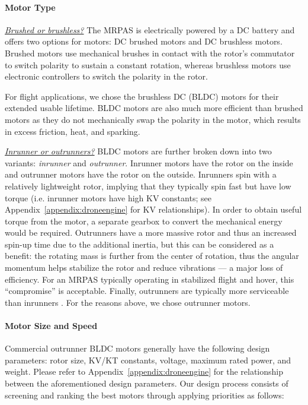 \paragraph{Motor Type}

\underline{\textit{Brushed or brushless?}}
The MRPAS is electrically powered by a DC battery and offers two options for motors: DC brushed motors and DC brushless motors. Brushed motors use mechanical brushes in contact with the rotor’s commutator to switch polarity to sustain a constant rotation, whereas brushless motors use electronic controllers to switch the polarity in the rotor. 

For flight applications, we chose the brushless DC (BLDC) motors for their extended usable lifetime. BLDC motors are also much more efficient than brushed motors as they do not mechanically swap the polarity in the motor, which results in excess friction, heat, and  sparking. 

\underline{\textit{Inrunner or outrunners?}}
BLDC motors are further broken down into two variants: \textit{inrunner} and \textit{outrunner}. Inrunner motors have the rotor on the inside and outrunner motors have the rotor on the outside.  Inrunners spin with a relatively lightweight rotor, implying that they typically spin fast but have low torque (i.e. inrunner motors have high KV constants; see Appendix~\ref{appendix:droneengine} for KV relationships). In order to obtain useful torque from the motor, a separate gearbox to convert the mechanical energy would be required\cite{invsoutrunner}. Outrunners have a more massive rotor and thus an increased spin-up time due to the additional inertia, but this can be considered as a benefit: the rotating mass is further from the center of rotation, thus the angular momentum helps stabilize the rotor and reduce vibrations --- a major loss of efficiency. For an MRPAS typically operating in stabilized flight and hover, this ``compromise'' is acceptable. Finally, outrunners are typically more serviceable than inrunners \cite{invsoutrunner}. For the reasons above, we chose outrunner motors.

\paragraph{Motor Size and Speed}\label{section:motor-speed}

Commercial outrunner BLDC motors generally have the following design parameters: rotor size, KV/KT constants, voltage, maximum rated power, and weight. Please refer to Appendix~\ref{appendix:droneengine} for the relationship between the aforementioned design parameters. Our design process consists of screening and ranking the best motors through applying priorities as follows:

